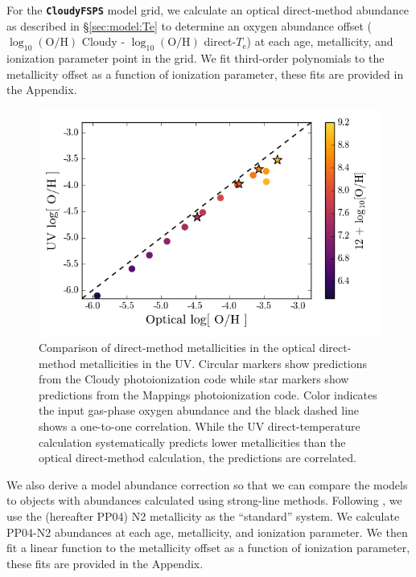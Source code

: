 \documentclass[preprint2]{aastex62}
\newcommand{\CloudyFSPS}{{\tt \textbf{CloudyFSPS}}\xspace}
\newcommand{\logten}{\ensuremath{\log_{10}}}
\newcommand{\logOH}{\ensuremath{\logten (\mathrm{O}/\mathrm{H})}\xspace}
\newcommand{\Te}{\ensuremath{T_{\mathrm{e}}}\xspace}
\begin{document}
For the \CloudyFSPS model grid, we calculate an optical direct-method abundance as described in \S\ref{sec:model:Te} to determine an oxygen abundance offset (\logOH Cloudy - \logOH direct-\Te)  at each age, metallicity, and ionization parameter point in the grid. We fit third-order polynomials to the metallicity offset as a function of ionization parameter, these fits are provided in the Appendix.

\begin{figure}
  \begin{center}
    \includegraphics[width=\linewidth]{figs/f1.png}
    \caption{Comparison of direct-method metallicities in the optical direct-method metallicities in the UV. Circular markers show predictions from the Cloudy photoionization code while star markers show predictions from the Mappings photoionization code. Color indicates the input gas-phase oxygen abundance and the black dashed line shows a one-to-one correlation. While the UV direct-temperature calculation systematically predicts lower metallicities than the optical direct-method calculation, the predictions are correlated.}
    \label{fig:UVoptZ}
  \end{center}
\end{figure}

We also derive a model abundance correction so that we can compare the models to objects with abundances calculated using strong-line methods. Following \citet{Kewley+2008}, we use the \citet{Pettini+2004} (hereafter PP04) N2 metallicity as the ``standard'' system. We calculate PP04-N2 abundances at each age, metallicity, and ionization parameter. We then fit a linear function to the metallicity offset as a function of ionization parameter, these fits are provided in the Appendix.
\end{document}
